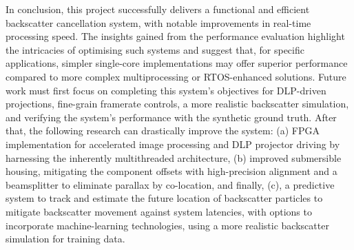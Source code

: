 In conclusion, this project successfully delivers a functional and efficient backscatter cancellation system, with notable improvements in real-time processing speed. The insights gained from the performance evaluation highlight the intricacies of optimising such systems and suggest that, for specific applications, simpler single-core implementations may offer superior performance compared to more complex multiprocessing or RTOS-enhanced solutions. Future work must first focus on completing this system's objectives for DLP-driven projections, fine-grain framerate controls, a more realistic backscatter simulation, and verifying the system's performance with the synthetic ground truth. After that, the following research can drastically improve the system: (a) FPGA implementation for accelerated image processing and DLP projector driving by harnessing the inherently multithreaded architecture, (b) improved submersible housing, mitigating the component offsets with high-precision alignment and a beamsplitter to eliminate parallax by co-location, and finally, (c), a predictive system to track and estimate the future location of backscatter particles to mitigate backscatter movement against system latencies, with options to incorporate machine-learning technologies, using a more realistic backscatter simulation for training data.
